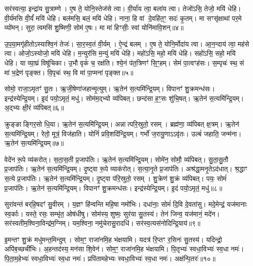 सर॑स्वत्या॒ इन्द्रा॑य सु॒त्राम्णे।
ए॒ष ते॒ योनि॒स्तेज॑से त्वा।
वी॒र्या॑य त्वा॒ बला॑य त्वा।
तेजो॑ऽसि॒ तेजो॒ मयि॑ धेहि।
वी॒र्य॑मसि वी॒र्यं॑ मयि॑ धेहि।
बल॑मसि॒ बलं॒ मयि॑ धेहि।
नाना॒ हि वां दे॒वहि॑त॒ꣳ॒ सदः॑ कृ॒तम्।
मा सꣳसृ॑क्षाथां पर॒मे व्यो॑मन्।
सुरा॒ त्वमसि॑ शु॒ष्मिणी॒ सोम॑ ए॒षः।
मा मा॑ हिꣳसीः॒ स्वां योनि॑मावि॒शन्॥४॥

उ॒प॒या॒मगृ॑हीतो\-ऽस्याश्वि॒नं तेजः॑।
सा॒र॒स्व॒तं वी॒र्यम्।
ऐ॒न्द्रं बलम्।
ए॒ष ते॒ योनि॒र्मोदा॑य त्वा।
आ॒न॒न्दाय॑ त्वा॒ मह॑से त्वा।
ओजो॒ऽस्योजो॒ मयि॑ धेहि।
म॒न्युर॑सि म॒न्युं मयि॑ धेहि।
महो॑ऽसि॒ महो॒ मयि॑ धेहि।
सहो॑ऽसि॒ सहो॒ मयि॑ धेहि।
या व्या॒घ्रं विषू॑चिका।
उ॒भौ वृकं॑ च॒ रक्ष॑ति।
श्ये॒नं प॑त॒त्रिणꣳ॑ सि॒ꣳ॒हम्।
सेमं पा॒त्वꣳह॑सः।
स॒म्पृचः॑ स्थ॒ सं मा॑ भ॒द्रेण॑ पृङ्क्त।
वि॒पृचः॑ स्थ॒ वि मा॑ पा॒प्मना॑ पृङ्क्त॥५॥\anuvakamend[ह॒विः प्र॒त्यङ्ख्सोमो॒ अति॑द्रुतो गृह्णाम्यावि॒शन्विषू॑चिका॒ पञ्च॑ च]

सोमो॒ राजा॒\-ऽमृतꣳ॑ सु॒तः।
ऋ॒जी॒षेणा॑जहान्मृ॒त्युम्।
ऋ॒तेन॑ स॒त्यमि॑न्द्रि॒यम्।
विपानꣳ॑ शु॒क्रमन्ध॑सः।
इन्द्र॑स्येन्द्रि॒यम्।
इ॒दं पयो॒\-ऽमृतं॒ मधु॑।
सोम॑म॒द्भ्यो व्य॑पिबत्।
छन्द॑सा ह॒ꣳ॒सः शु॑चि॒षत्।
ऋ॒तेन॑ स॒त्यमि॑न्द्रि॒यम्।
अ॒द्भ्यः क्षी॒रं व्य॑पिबत्॥६॥

क्रुङ्ङाङ्गिर॒सो धि॒या।
ऋ॒तेन॑ स॒त्यमि॑न्द्रि॒यम्।
अन्नात्परि॒स्रुतो॒ रसम्।
ब्रह्म॑णा॒ व्य॑पिबत् क्ष॒त्रम्।
ऋ॒तेन॑ स॒त्यमि॑न्द्रि॒यम्।
रेतो॒ मूत्रं॒ विज॑हाति।
योनिं॑ प्रवि॒शदि॑न्द्रि॒यम्।
गर्भो॑ ज॒रायु॒णा\-ऽऽवृ॑तः।
उल्बं॑ जहाति॒ जन्म॑ना।
ऋ॒तेन॑ स॒त्यमि॑न्द्रि॒यम्॥७॥

वेदे॑न रू॒पे व्य॑करोत्।
स॒ता॒स॒ती प्र॒जाप॑तिः।
ऋ॒तेन॑ स॒त्यमि॑न्द्रि॒यम्।
सोमे॑न॒ सोमौ॒ व्य॑पिबत्।
सु॒ता॒सु॒तौ प्र॒जाप॑तिः।
ऋ॒तेन॑ स॒त्यमि॑न्द्रि॒यम्।
दृ॒ष्ट्वा रू॒पे व्याक॑रोत्।
स॒त्या॒नृ॒ते प्र॒जाप॑तिः।
अश्र॑द्धा॒मनृ॒ते\-ऽद॑धात्।
श्र॒द्धाꣳ स॒त्ये प्र॒जाप॑तिः।
ऋ॒तेन॑ स॒त्यमि॑न्द्रि॒यम्।
दृ॒ष्ट्वा प॑रि॒स्रुतो॒ रसम्।
शु॒क्रेण॑ शु॒क्रं व्य॑पिबत्।
पयः॒ सोमं॑ प्र॒जाप॑तिः।
ऋ॒तेन॑ स॒त्यमि॑न्द्रि॒यम्।
विपानꣳ॑ शु॒क्रमन्ध॑सः।
इन्द्र॑स्येन्द्रि॒यम्।
इ॒दं पयो॒\-ऽमृतं॒ मधु॑॥८॥\anuvakamend[अ॒द्भ्यः क्षी॒रं व्य॑पिब॒ज्जन्म॑न॒र्तेन॑ स॒त्यमि॑न्द्रि॒यꣴ श्र॒द्धाꣳ स॒त्ये प्र॒जाप॑तिर॒ष्टौ च॑]

सुरा॑वन्तं बर्‌\mbox{}हि॒षदꣳ॑ सु॒वीरम्।
य॒ज्ञꣳ हि॑न्वन्ति महि॒षा नमो॑भिः।
दधा॑नाः॒ सोमं॑ दि॒वि दे॒वता॑सु।
मदे॒मेन्द्रं॒ यज॑मानाः स्व॒र्काः।
यस्ते॒ रसः॒ सम्भृ॑त॒ ओष॑धीषु।
सोम॑स्य॒ शुष्मः॒ सुर॑या सु॒तस्य॑।
तेन॑ जिन्व॒ यज॑मानं॒ मदे॑न।
सर॑स्वतीम॒श्विना॒विन्द्र॑म॒ग्निम्।
यम॒श्विना॒ नमु॑चेरासु॒रादधि॑।
सर॑स्व॒त्यस॑नोदिन्द्रि॒याय॑॥९॥

इ॒मन्तꣳ शु॒क्रं मधु॑मन्त॒मिन्दुम्।
सोम॒ꣳ॒ राजा॑नमि॒ह भ॑क्षयामि।
यदत्र॑ रि॒प्तꣳ र॒सिनः॑ सु॒तस्य॑।
यदिन्द्रो॒ अपि॑ब॒च्छची॑भिः।
अ॒हन्तद॑स्य॒ मन॑सा शि॒वेन॑।
सोम॒ꣳ॒ राजा॑नमि॒ह भ॑क्षयामि।
पि॒तृभ्यः॑ स्वधा॒विभ्यः॑ स्व॒धा नमः॑।
पि॒ता॒म॒हेभ्यः॑ स्वधा॒विभ्यः॑ स्व॒धा नमः॑।
प्रपि॑तामहेभ्यः स्वधा॒विभ्यः॑ स्व॒धा नमः॑।
अक्ष॑न्पि॒तरः॑॥१०॥

